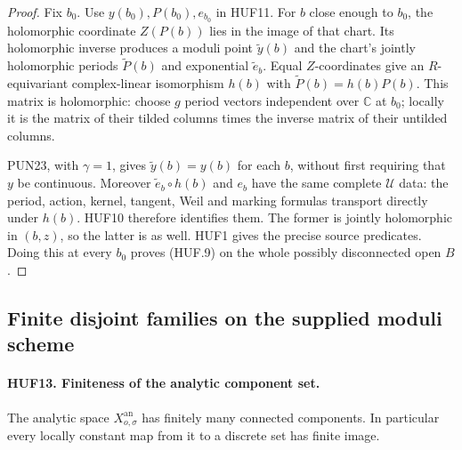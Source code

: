 \begin{proof}
Fix \(b_0\).  Use \(y(b_0),P(b_0),e_{b_0}\) in HUF11.
For \(b\) close enough to \(b_0\), the holomorphic
coordinate \(Z(P(b))\) lies in the image of that chart.
Its holomorphic inverse produces a moduli point
\(\widetilde y(b)\) and the chart's jointly
holomorphic periods \(\widetilde P(b)\) and exponential
\(\widetilde e_b\).  Equal \(Z\)-coordinates give
an \(R\)-equivariant complex-linear isomorphism
\(h(b)\) with
\(\widetilde P(b)=h(b)P(b)\).
This matrix is holomorphic: choose \(g\) period
vectors independent over \(\mathbb C\) at \(b_0\);
locally it is the matrix of their tilded columns
times the inverse matrix of their untilded columns.

PUN23, with \(\gamma=1\), gives
\(\widetilde y(b)=y(b)\) for each \(b\), without
first requiring that \(y\) be continuous.
Moreover \(\widetilde e_b\circ h(b)\) and \(e_b\)
have the same complete \(\mathcal U\) data:
the period, action, kernel, tangent, Weil and
marking formulas transport directly under \(h(b)\).
HUF10 therefore identifies them.  The former is
jointly holomorphic in \((b,z)\), so the latter is
as well.  HUF1 gives the precise source predicates.
Doing this at every \(b_0\) proves (HUF.9) on
the whole possibly disconnected open \(B\).
\end{proof}

\subsection{Finite disjoint families on the supplied moduli scheme}

\paragraph{HUF13. Finiteness of the analytic component set.}
\label{claim:HUF13}
The analytic space \(X_{o,\sigma}^{\mathrm{an}}\) has
finitely many connected components.  In particular every
locally constant map from it to a discrete set has finite
image.

